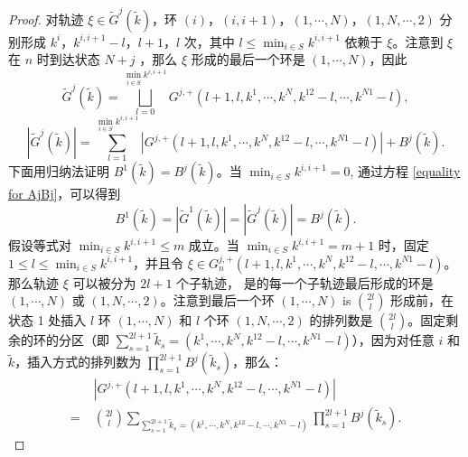 \begin{appendices}
\begin{proof}
    对轨迹 $\xi\in\tilde{G}^j(\tilde{k})$，环 $(i)$，$(i,i+1)$，$(1,\cdots,N)$，$(1,N,\cdots,2)$ 分别形成 $k^i$，$k^{i,i+1}-l$，$l+1$，$l$ 次，其中 $l\le \min_{i\in S}k^{i,i+1}$ 依赖于 $\xi$。注意到 $\xi$ 在 $n$ 时到达状态 $N+j$ ，那么 $\xi$ 形成的最后一个环是 $(1,\cdots,N)$，因此
	\begin{equation*}
		\tilde{G}^j\left(\tilde{k}\right)=\bigsqcup_{l=0}^{\min_{i\in S}k^{i,i+1}}G^{j,+}\left(l+1,l,k^1,\cdots,k^N,k^{12}-l,\cdots,k^{N1}-l\right),
	\end{equation*}
	\begin{equation}\label{equality for AjBj}
		\left|\tilde{G}^j\left(\tilde{k}\right)\right|=\sum_{l=1}^{\min_{i\in S}k^{i,i+1}}\left|G^{j,+}\left(l+1,l,k^1,\cdots,k^N,k^{12}-l,\cdots,k^{N1}-l\right)\right|+B^j\left(\tilde{k}\right).
	\end{equation}
	下面用归纳法证明 $B^1(\tilde{k})=B^j(\tilde{k})$。当 $\min_{i\in S}k^{i,i+1}=0$, 通过方程 \eqref{equality for AjBj}，可以得到 
    \begin{equation*}
		B^1(\tilde{k})=|\tilde{G}^1(\tilde{k})|=|\tilde{G}^j(\tilde{k})|=B^j(\tilde{k}).
	\end{equation*} 
	假设等式对 $\min_{i\in S}k^{i,i+1}\le m$ 成立。当 $\min_{i\in S}k^{i,i+1}=m+1$ 时，固定 $1\le l\le \min_{i\in S}k^{i,i+1}$，并且令 $\xi\in G^{j,+}_n(l+1,l,k^1,\cdots,k^N,k^{12}-l,\cdots,k^{N1}-l)$。那么轨迹 $\xi$ 可以被分为 $2l+1$ 个子轨迹， 是的每一个子轨迹最后形成的环是 $(1,\cdots,N)$ 或 $(1,N,\cdots,2)$。注意到最后一个环 $(1,\cdots,N)$ is $\binom{2l}{l}$ 形成前，在状态 1 处插入 $l$ 环 $(1,\cdots,N)$ 和 $l$ 个环 $(1,N,\cdots,2)$ 的排列数是 $\binom{2l}{l}$。固定剩余的环的分区（即 $\sum_{s=1}^{2l+1}\tilde{k}_s=(k^1,\cdots,k^N,k^{12}-l,\cdots,k^{N1}-l)$），因为对任意 $i$ 和 $\tilde{k}$，插入方式的排列数为 $\prod_{s=1}^{2l+1}B^j(\tilde{k}_s)$，那么：
	\begin{align*}
		&\;\left|G^{j,+}\left(l+1,l,k^1,\cdots,k^N,k^{12}-l,\cdots,k^{N1}-l\right)\right|\\
		=&\;\binom{2l}{l}\sum_{\sum_{s=1}^{2l+1}\tilde{k}_s=(k^1,\cdots,k^N,k^{12}-l,\cdots,k^{N1}-l)}\prod_{s=1}^{2l+1}B^j\left(\tilde{k}_s\right).
	\end{align*}
	

\end{proof}
\end{appendices}
